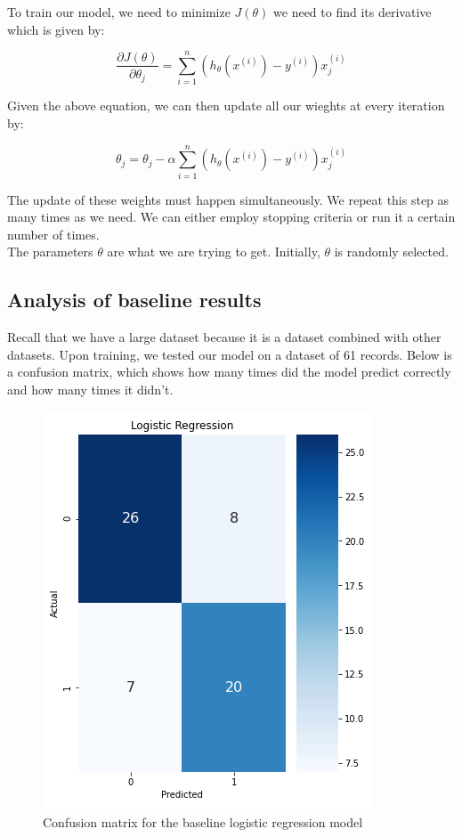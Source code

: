 To train our model, we need to minimize $J(\theta)$ we need to find its derivative which is given by:

\begin{equation}
    \frac{\partial J(\theta)}{\partial \theta_j} = \sum_{i=1}^n ( h_{\theta}(x^{(i)}) - y^{(i)} )x_j^{(i)}
\end{equation}

Given the above equation, we can then update all our wieghts at every iteration by:

\begin{equation}
    \theta_j = \theta_j - \alpha \sum_{i=1}^n ( h_{\theta}(x^{(i)}) - y^{(i)} )x_j^{(i)}
\end{equation}

The update of these weights must happen simultaneously. We repeat this step as many times as we need. We can either employ stopping criteria or run it a certain number of times.
\\
The parameters $\theta$ are what we are trying to get. Initially, $\theta$ is randomly selected.

\subsection{Analysis of baseline results}
Recall that we have a large dataset because it is a dataset combined with other datasets. Upon training, we tested our model on a dataset of 61 records. Below is a confusion matrix, which shows how many times did the model predict correctly and how many times it didn't.
\begin{figure}[H]
    \begin{center}
        \includegraphics[scale=0.5]{Images/logCONFUSION.png}
    \end{center}
    \caption{Confusion matrix for the baseline logistic regression model}
\end{figure}

